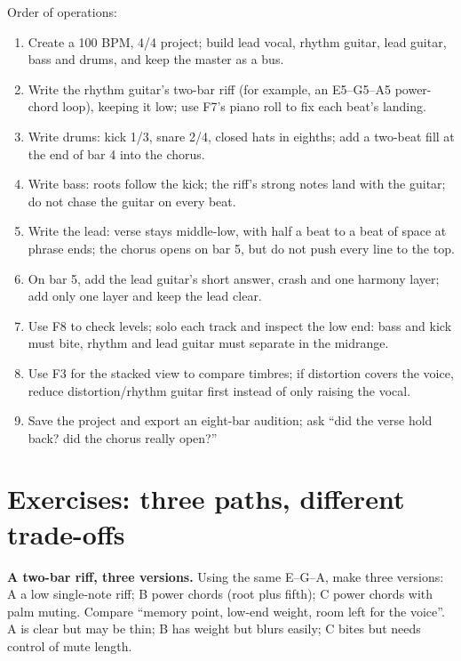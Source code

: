 Order of operations:

\begin{enumerate}
\item Create a 100 BPM, 4/4 project; build lead vocal, rhythm guitar, lead guitar, bass and drums, and keep the master as a bus.
\item Write the rhythm guitar's two-bar riff (for example, an E5--G5--A5 power-chord loop), keeping it low; use F7's piano roll to fix each beat's landing.
\item Write drums: kick 1/3, snare 2/4, closed hats in eighths; add a two-beat fill at the end of bar 4 into the chorus.
\item Write bass: roots follow the kick; the riff's strong notes land with the guitar; do not chase the guitar on every beat.
\item Write the lead: verse stays middle-low, with half a beat to a beat of space at phrase ends; the chorus opens on bar 5, but do not push every line to the top.
\item On bar 5, add the lead guitar's short answer, crash and one harmony layer; add only one layer and keep the lead clear.
\item Use F8 to check levels; solo each track and inspect the low end: bass and kick must bite, rhythm and lead guitar must separate in the midrange.
\item Use F3 for the stacked view to compare timbres; if distortion covers the voice, reduce distortion/rhythm guitar first instead of only raising the vocal.
\item Save the project and export an eight-bar audition; ask ``did the verse hold back? did the chorus really open?''
\end{enumerate}

\section{Exercises: three paths, different trade-offs}
\label{sec:rock-practice}

\begin{exercise}
\textbf{A two-bar riff, three versions.} Using the same E--G--A, make three versions: A a low single-note riff; B power chords (root plus fifth); C power chords with palm muting. Compare ``memory point, low-end weight, room left for the voice''. A is clear but may be thin; B has weight but blurs easily; C bites but needs control of mute length.
\end{exercise}

